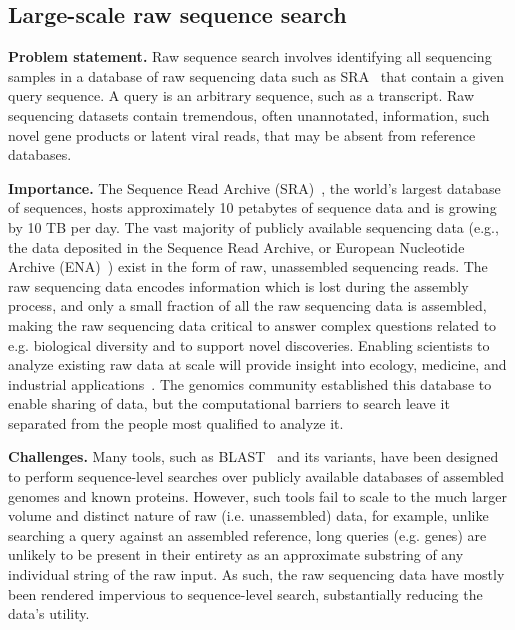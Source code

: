 \subsection{Large-scale raw sequence search}
\label{subsec:lss}

\textbf{Problem statement.} Raw sequence search involves identifying all sequencing samples in a database of raw sequencing data such as SRA~\cite{kodama2012sequence,KatzSLKBO22} that contain a given query sequence. A query is an arbitrary sequence, such as a transcript. Raw sequencing datasets contain tremendous, often unannotated, information, such novel gene products or latent viral reads, that may be absent from reference databases.

\noindent
\textbf{Importance.}
The Sequence Read Archive (SRA)~\cite{kodama2012sequence}, the world’s largest database of sequences, hosts approximately 10 petabytes %
of sequence data and is growing by 
10 TB per day.
%
The vast majority of publicly available sequencing data (e.g., the data deposited in the Sequence Read Archive, or European Nucleotide Archive (ENA)~\cite{CumminsAABDEGHH22}) exist in the form of raw, unassembled sequencing reads. The raw sequencing data encodes information which is lost during the assembly process, and only a small fraction of all the raw sequencing data is assembled, making the raw sequencing data critical to answer complex questions related to e.g. biological diversity and to support novel discoveries.
%
Enabling scientists to analyze existing raw data at scale will provide insight into ecology, medicine, and industrial applications~\cite{LeviRAE18}.
%
The genomics community established this database to enable sharing of data, but the computational barriers to search leave it separated from the people most qualified to analyze it.

\noindent
\textbf{Challenges.}
Many tools, such as BLAST~\cite{altschul1990basic} and its variants, have been designed to perform sequence-level searches over publicly available databases of assembled genomes and known proteins. %
However, such tools fail to scale to the much larger volume and distinct nature of raw (i.e. unassembled) data, for example, unlike searching a query against an assembled reference, long queries (e.g. genes) are unlikely to be present in their entirety as an approximate substring of any individual string of the raw input. As such, the raw sequencing data have mostly been rendered impervious to sequence-level search, substantially reducing the data's utility.
%

